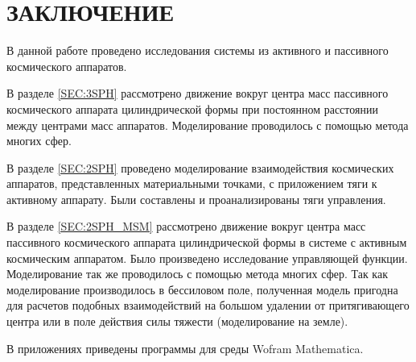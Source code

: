 \section*{ЗАКЛЮЧЕНИЕ}

В данной работе проведено исследования системы из активного и пассивного космического аппаратов.

В разделе \ref{SEC:3SPH} рассмотрено движение вокруг центра масс пассивного космического аппарата цилиндрической формы при постоянном расстоянии между центрами масс аппаратов. Моделирование проводилось с помощью метода многих сфер.

В разделе \ref{SEC:2SPH} проведено моделирование взаимодействия космических аппаратов, представленных материальными точками, с приложением тяги к активному аппарату. Были составлены и проанализированы тяги управления.

В разделе \ref{SEC:2SPH_MSM} рассмотрено движение вокруг центра масс пассивного космического аппарата цилиндрической формы в системе с активным космическим аппаратом. Было произведено исследование управляющей функции. Моделирование так же проводилось с помощью метода многих сфер. Так как моделирование производилось в бессиловом поле, полученная модель пригодна для расчетов подобных взаимодействий на большом удалении от притягивающего центра или в поле действия силы тяжести (моделирование на земле).

В приложениях приведены программы для среды Wofram Mathematica.